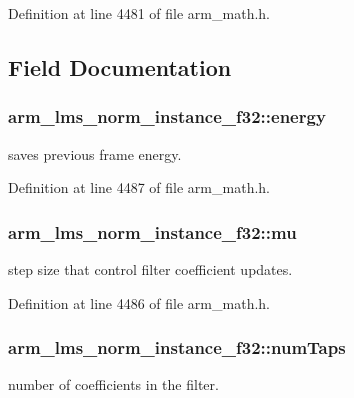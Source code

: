 Definition at line 4481 of file arm\-\_\-math.\-h.



\subsection{Field Documentation}
\hypertarget{structarm__lms__norm__instance__f32_a6a4119e4f39447bbee31b066deafa16f}{
\subsubsection[{energy}]{ arm\-\_\-lms\-\_\-norm\-\_\-instance\-\_\-f32\-::energy}}\label{structarm__lms__norm__instance__f32_a6a4119e4f39447bbee31b066deafa16f}
saves previous frame energy. 

Definition at line 4487 of file arm\-\_\-math.\-h.

\hypertarget{structarm__lms__norm__instance__f32_a84401d3cfc6c40f69c08223cf341b886}{
\subsubsection[{mu}]{ arm\-\_\-lms\-\_\-norm\-\_\-instance\-\_\-f32\-::mu}}\label{structarm__lms__norm__instance__f32_a84401d3cfc6c40f69c08223cf341b886}
step size that control filter coefficient updates. 

Definition at line 4486 of file arm\-\_\-math.\-h.

\hypertarget{structarm__lms__norm__instance__f32_ac95f8ca3d816524c2070643852fac5e8}{
\subsubsection[{num\-Taps}]{ arm\-\_\-lms\-\_\-norm\-\_\-instance\-\_\-f32\-::num\-Taps}}\label{structarm__lms__norm__instance__f32_ac95f8ca3d816524c2070643852fac5e8}
number of coefficients in the filter. 

